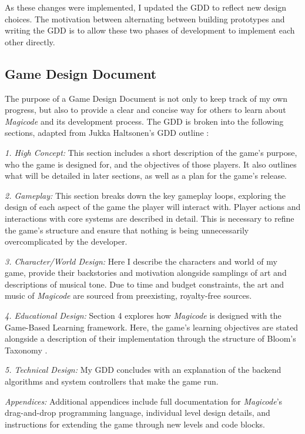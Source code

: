 \documentclass[10pt,twocolumn]{article}
\begin{document}
As these changes were implemented, I updated the GDD to reflect new design choices. The motivation between alternating between building prototypes and writing the GDD is to allow these two phases of development to implement each other directly.


\subsection{Game Design Document}
The purpose of a Game Design Document is not only to keep track of my own progress, but also to provide a clear and concise way for others to learn about \textit{Magicode} and its development process. The GDD is broken into the following sections, adapted from Jukka Haltsonen’s GDD outline \cite{gdd-guide}:

\textit{1. High Concept:} This section includes a short description of the game’s purpose, who the game is designed for, and the objectives of those players. It also outlines what will be detailed in later sections, as well as a plan for the game’s release.

\textit{2. Gameplay:} This section breaks down the key gameplay loops, exploring the design of each aspect of the game the player will interact with. Player actions and interactions with core systems are described in detail. This is necessary to refine the game’s structure and ensure that nothing is being unnecessarily overcomplicated by the developer.

\textit{3. Character/World Design:} Here I describe the characters and world of my game, provide their backstories and motivation alongside samplings of art and descriptions of musical tone. Due to time and budget constraints, the art and music of \textit{Magicode} are sourced from preexisting, royalty-free sources.

\textit{4. Educational Design:} Section 4 explores how \textit{Magicode} is designed with the Game-Based Learning framework. Here, the game’s learning objectives are stated alongside a description of their implementation through the structure of Bloom’s Taxonomy \cite{bloom-taxonomy}.

\textit{5. Technical Design:} My GDD concludes with an explanation of the backend algorithms and system controllers that make the game run.

\textit{Appendices:} Additional appendices include full documentation for \textit{Magicode}’s drag-and-drop programming language, individual level design details, and instructions for extending the game through new levels and code blocks.
\end{document}

